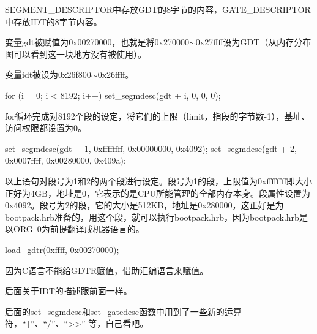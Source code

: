 SEGMENT\_DESCRIPTOR中存放GDT的8字节的内容，GATE\_DESCRIPTOR中存放IDT的8字节内容。

变量gdt被赋值为0x00270000，也就是将0x270000$\sim$0x27ffff设为GDT（从内存分布图可以看到这一块地方没有被使用）。

变量idt被设为0x26f800$\sim$0x26ffff。
\cs

\begin{code}
for (i = 0; i < 8192; i++) {
		set_segmdesc(gdt + i, 0, 0, 0);
	}
\end{code}

for循环完成对8192个段的设定，将它们的上限（limit，指段的字节数-1），基址、访问权限都设置为0。

\begin{code}
    set_segmdesc(gdt + 1, 0xffffffff, 0x00000000, 0x4092);
	set_segmdesc(gdt + 2, 0x0007ffff, 0x00280000, 0x409a);
\end{code}

以上语句对段号为1和2的两个段进行设定。段号为1的段，上限值为0xffffffff即大小正好为4GB，地址是0，它表示的是CPU所能管理的全部内存本身。段属性设置为0x4092。段号为2的段，它的大小是512KB，地址是0x280000，这正好是为bootpack.hrb准备的，用这个段，就可以执行bootpack.hrb，因为bootpack.hrb是以ORG~0为前提翻译成机器语言的。

\begin{code}
  load_gdtr(0xffff, 0x00270000);
\end{code}

因为C语言不能给GDTR赋值，借助汇编语言来赋值。

后面关于IDT的描述跟前面一样。

后面的set\_segmdesc和set\_gatedesc函数中用到了一些新的运算符，“\verb"|"”、“/”、“>>” 等，自己看吧。

